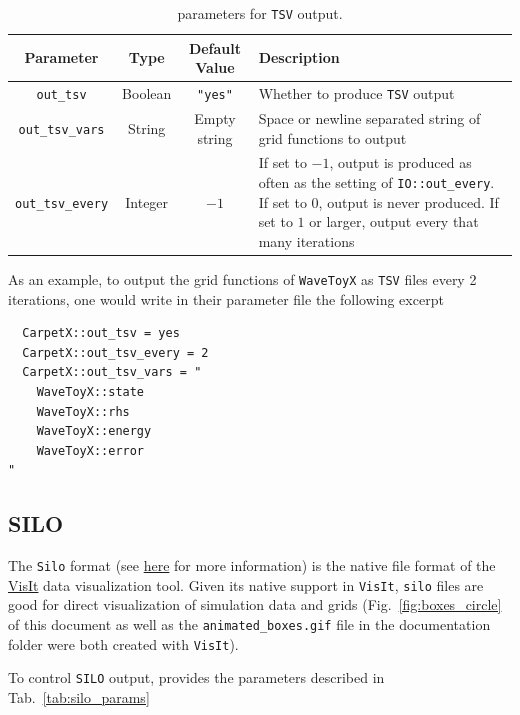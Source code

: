 \begin{table}[ht]
  \centering
  \begin{tabular*}{\textwidth}{cccp{24em}}
    Parameter                & Type    & Default Value  & Description \\\hline\hline
    \texttt{out\_tsv}        & Boolean & \texttt{"yes"} & Whether to produce \texttt{TSV} output \\
    \texttt{out\_tsv\_vars}  & String  & Empty string   & Space or newline separated string of grid functions to output \\
    \texttt{out\_tsv\_every} & Integer & $-1$           & If set to $-1$, output is produced as often as the setting of \texttt{IO::out\_every}. If set to $0$, output is never produced. If set to $1$ or larger, output every that many iterations \\\hline\hline
  \end{tabular*}
  \label{tab:tsv_params}
  \caption{\CarpetX\space parameters for \texttt{TSV} output.}
\end{table}

As an example, to output the grid functions of \texttt{WaveToyX} as \texttt{TSV} files every 2 iterations, one would write in their parameter file the following excerpt

\begin{verbatim}
  CarpetX::out_tsv = yes
  CarpetX::out_tsv_every = 2
  CarpetX::out_tsv_vars = "
    WaveToyX::state
    WaveToyX::rhs
    WaveToyX::energy
    WaveToyX::error
"
\end{verbatim}

\subsection{SILO}
\label{sec:silo}

The \texttt{Silo} format (see \href{https://visit-sphinx-github-user-manual.readthedocs.io/en/develop/data_into_visit/SiloFormat.html}{here} for more information) is the native file format of the \href{https://sd.llnl.gov/simulation/computer-codes/visit}{VisIt} data visualization tool. Given its native support in \texttt{VisIt}, \texttt{silo} files are good for direct visualization of simulation data and grids (Fig.~\ref{fig:boxes_circle} of this document as well as the \texttt{animated\_boxes.gif} file in the documentation folder were both created with \texttt{VisIt}).

To control \texttt{SILO} output, \CarpetX\space provides the parameters described in Tab.~\ref{tab:silo_params}


